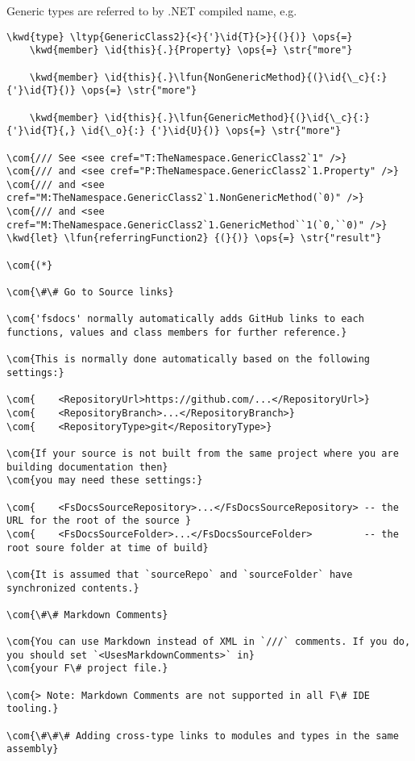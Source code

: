\documentclass{article}
\newcommand{\id}[1]{\textcolor{black}{#1}}
\newcommand{\com}[1]{\textcolor{officegreen}{#1}}
\newcommand{\kwd}[1]{\textcolor{navy}{#1}}
\newcommand{\ops}[1]{\textcolor{purple}{#1}}
\newcommand{\str}[1]{\textcolor{olive}{#1}}
\begin{document}
Generic types are referred to by .NET compiled name, e.g.
\begin{Verbatim}[commandchars=\\\{\}]
\kwd{type} \ltyp{GenericClass2}{<}{'}\id{T}{>}{(}{)} \ops{=} 
    \kwd{member} \id{this}{.}{Property} \ops{=} \str{"more"}

    \kwd{member} \id{this}{.}\lfun{NonGenericMethod}{(}\id{\_c}{:} {'}\id{T}{)} \ops{=} \str{"more"}

    \kwd{member} \id{this}{.}\lfun{GenericMethod}{(}\id{\_c}{:} {'}\id{T}{,} \id{\_o}{:} {'}\id{U}{)} \ops{=} \str{"more"}

\com{/// See <see cref="T:TheNamespace.GenericClass2`1" />}
\com{/// and <see cref="P:TheNamespace.GenericClass2`1.Property" />}
\com{/// and <see cref="M:TheNamespace.GenericClass2`1.NonGenericMethod(`0)" />}
\com{/// and <see cref="M:TheNamespace.GenericClass2`1.GenericMethod``1(`0,``0)" />}
\kwd{let} \lfun{referringFunction2} {(}{)} \ops{=} \str{"result"}

\com{(*}

\com{\#\# Go to Source links}

\com{'fsdocs' normally automatically adds GitHub links to each functions, values and class members for further reference.}

\com{This is normally done automatically based on the following settings:}

\com{    <RepositoryUrl>https://github.com/...</RepositoryUrl>}
\com{    <RepositoryBranch>...</RepositoryBranch>}
\com{    <RepositoryType>git</RepositoryType>}

\com{If your source is not built from the same project where you are building documentation then}
\com{you may need these settings:}

\com{    <FsDocsSourceRepository>...</FsDocsSourceRepository> -- the URL for the root of the source }
\com{    <FsDocsSourceFolder>...</FsDocsSourceFolder>         -- the root soure folder at time of build}

\com{It is assumed that `sourceRepo` and `sourceFolder` have synchronized contents.}

\com{\#\# Markdown Comments}

\com{You can use Markdown instead of XML in `///` comments. If you do, you should set `<UsesMarkdownComments>` in}
\com{your F\# project file.}

\com{> Note: Markdown Comments are not supported in all F\# IDE tooling.}

\com{\#\#\# Adding cross-type links to modules and types in the same assembly}


\end{Verbatim}
\end{document}
